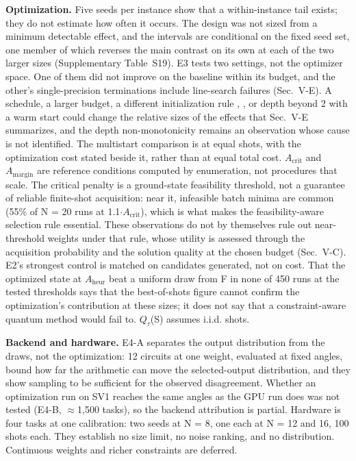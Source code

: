 \documentclass[journal]{IEEEtran}
\begin{document}
\textbf{Optimization.} Five seeds per instance show that a within-instance tail exists; they do not estimate how often it occurs. The design was not sized from a minimum detectable effect, and the intervals are conditional on the fixed seed set, one member of which reverses the main contrast on its own at each of the two larger sizes (Supplementary Table~S19). E3 tests two settings, not the optimizer space. One of them did not improve on the baseline within its budget, and the other's single-precision terminations include line-search failures (Sec.~V-E). A schedule, a larger budget, a different initialization rule \cite{ref32}, \cite{ref33}, or depth beyond 2 with a warm start could change the relative sizes of the effects that Sec.~V-E summarizes, and the depth non-monotonicity remains an observation whose cause is not identified. The multistart comparison is at equal shots, with the optimization cost stated beside it, rather than at equal total cost. $A_{\mathrm{crit}}$ and $A_{\mathrm{margin}}$ are reference conditions computed by enumeration, not procedures that scale. The critical penalty is a ground-state feasibility threshold, not a guarantee of reliable finite-shot acquisition: near it, infeasible batch minima are common (55\% of N = 20 runs at 1.1$\cdot$$A_{\mathrm{crit}}$), which is what makes the feasibility-aware selection rule essential. These observations do not by themselves rule out near-threshold weights under that rule, whose utility is assessed through the acquisition probability and the solution quality at the chosen budget (Sec.~V-C). E2's strongest control is matched on candidates generated, not on cost. That the optimized state at $A_{\mathrm{heur}}$ beat a uniform draw from F in none of 450 runs at the tested thresholds says that the best-of-shots figure cannot confirm the optimization's contribution at these sizes; it does not say that a constraint-aware quantum method would fail to. $Q_{\tau}$(S) assumes i.i.d. shots.


\textbf{Backend and hardware.} E4-A separates the output distribution from the draws, not the optimization: 12 circuits at one weight, evaluated at fixed angles, bound how far the arithmetic can move the selected-output distribution, and they show sampling to be sufficient for the observed disagreement. Whether an optimization run on SV1 reaches the same angles as the GPU run does was not tested (E4-B, $\approx$1,500 tasks), so the backend attribution is partial. Hardware is four tasks at one calibration: two seeds at N = 8, one each at N = 12 and 16, 100 shots each. They establish no size limit, no noise ranking, and no distribution. Continuous weights and richer constraints are deferred.
\end{document}
